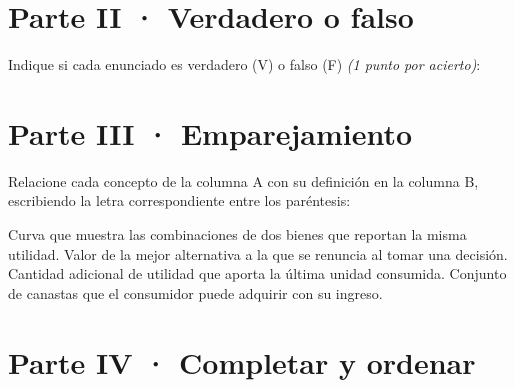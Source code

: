 \documentclass{academic-exam}
\begin{document}
\section*{\color{colorprimario}Parte II · Verdadero o falso}

\begin{pregunta}[4]
Indique si cada enunciado es verdadero (V) o falso (F)
\emph{(1 punto por acierto)}:
\begin{tablavf}
\end{tablavf}
\end{pregunta}

\section*{\color{colorprimario}Parte III · Emparejamiento}

\begin{pregunta}[4]
Relacione cada concepto de la columna A con su definición en la columna B,
escribiendo la letra correspondiente entre los paréntesis:
\begin{emparejamiento}
    {Curva que muestra las combinaciones de dos bienes que reportan la
     misma utilidad.}
    {Valor de la mejor alternativa a la que se renuncia al tomar una
     decisión.}
    {Cantidad adicional de utilidad que aporta la última unidad consumida.}
    {Conjunto de canastas que el consumidor puede adquirir con su ingreso.}
\end{emparejamiento}
\end{pregunta}

\section*{\color{colorprimario}Parte IV · Completar y ordenar}
\end{document}
